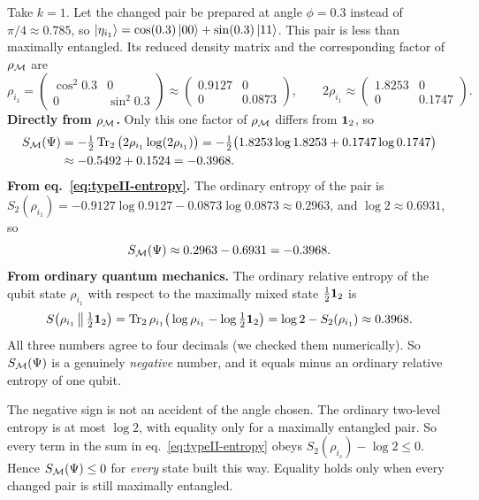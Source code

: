 \begin{workedexamplebox}[: One changed pair at angle $\phi=0.3$]
Take $k=1$. Let the changed pair be prepared at angle $\phi=0.3$ instead of $\pi/4\approx0.785$, so
$\ket{\eta_{i_1}}=\cos(0.3)\ket{00}+\sin(0.3)\ket{11}$. This pair is less than maximally entangled. Its reduced
density matrix and the corresponding factor of $\rho_{\mathcal{M}}$ are
\[
\rho_{i_1}=\begin{pmatrix}\cos^2 0.3&0\\0&\sin^2 0.3\end{pmatrix}
\approx\begin{pmatrix}0.9127&0\\0&0.0873\end{pmatrix} , \qquad
2\rho_{i_1}\approx\begin{pmatrix}1.8253&0\\0&0.1747\end{pmatrix} .
\]
\textbf{Directly from $\rho_{\mathcal{M}}$.} Only this one factor of $\rho_{\mathcal{M}}$ differs from $\mathbf{1}_2$, so
\begin{align*}
S_{\mathcal{M}}(\Psi) &= -\tfrac12\operatorname{Tr}_2\big(2\rho_{i_1}\log(2\rho_{i_1})\big)
= -\tfrac12\big(1.8253\log1.8253+0.1747\log0.1747\big) \\
&\approx -0.5492+0.1524 = -0.3968 .
\end{align*}
\textbf{From eq.~\eqref{eq:typeII-entropy}.} The ordinary entropy of the pair is
$S_2(\rho_{i_1})=-0.9127\log0.9127-0.0873\log0.0873\approx0.2963$, and $\log2\approx0.6931$, so
\[
S_{\mathcal{M}}(\Psi) \approx 0.2963 - 0.6931 = -0.3968 .
\]
\textbf{From ordinary quantum mechanics.} The ordinary relative entropy of the qubit state $\rho_{i_1}$ with
respect to the maximally mixed state $\tfrac12\mathbf{1}_2$ is
\[
S\big(\rho_{i_1}\,\big\|\,\tfrac12\mathbf{1}_2\big)=\operatorname{Tr}_2\rho_{i_1}\big(\log\rho_{i_1}-\log\tfrac12\mathbf{1}_2\big)
=\log2-S_2(\rho_{i_1})\approx0.3968 .
\]
All three numbers agree to four decimals (we checked them numerically). So $S_{\mathcal{M}}(\Psi)$ is a genuinely
\emph{negative} number, and it equals minus an ordinary relative entropy of one qubit.
\end{workedexamplebox}

The negative sign is not an accident of the angle chosen. The ordinary two-level entropy is at most $\log2$,
with equality only for a maximally entangled pair. So every term in the sum in eq.~\eqref{eq:typeII-entropy}
obeys $S_2(\rho_{i_s})-\log2\le0$. Hence $S_{\mathcal{M}}(\Psi)\le0$ for \emph{every} state built this way. Equality holds
only when every changed pair is still maximally entangled.


